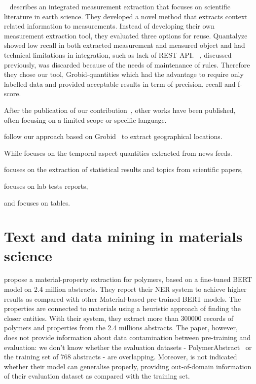 \documentclass[12pt, a4paper]{report}
\begin{document}
~\cite{hundman2017measurement} describes an integrated measurement extraction that focuses on scientific literature in earth science. 
They developed a novel method that extracts context related information to measurements. Instead of developing their own measurement extraction tool, they evaluated three options for reuse. Quantalyze showed low recall in both extracted measurement and measured object and had technical limitations in integration, such as lack of REST API. ~\cite{agatonovic2008large}, discussed previously, was discarded because of the needs of maintenance of rules. 
Therefore they chose our tool, Grobid-quantities which had the advantage to require only labelled data and provided acceptable results in term of precision, recall and f-score. 

After the publication of our contribution~\cite{foppiano2019quantities}, other works have been published, often focusing on a limited scope or specific language. 

\cite{petersen2021geoquantities} follow our approach based on Grobid~\cite{GROBID} to extract geographical locations.


While \cite{ning2022ameta} focuses on the temporal aspect quantities extracted from news feeds. 

\cite{epp2021stereo} focuses on the extraction of statistical results and topics from scientific papers, 

\cite{hao2016} focuses on lab tests reports, 

and \cite{taha2021identifying, ho2021qute} focuses on tables.


\section{Text and data mining in materials science}

\cite{pranav2023a} propose a material-property extraction for polymers, based on a fine-tuned BERT model on 2.4 million abstracts. They report their NER system to achieve higher results as compared with other Material-based pre-trained BERT models. The properties are connected to materials using a heuristic approach of finding the closer entities.
With their system, they extract more than 300000 records of polymers and properties from the 2.4 millions abstracts. 
The paper, however, does not provide information about data contamination between pre-training and evaluation: we don't know whether the evaluation datasets - PolymerAbstract~\cite{huan2016a} or the training set of 768 abstracts - are overlapping. 
Moreover, is not indicated whether their model can generalise properly, providing out-of-domain information of their evaluation dataset as compared with the training set. 
\end{document}
